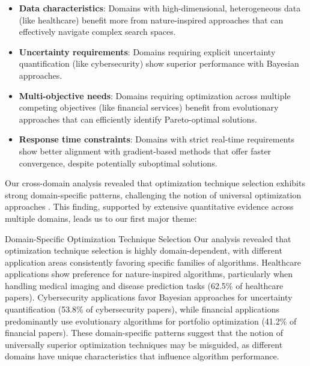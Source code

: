 \begin{itemize}
    \item \textbf{Data characteristics}: Domains with high-dimensional, heterogeneous data (like healthcare) benefit more from nature-inspired approaches that can effectively navigate complex search spaces.
    
    \item \textbf{Uncertainty requirements}: Domains requiring explicit uncertainty quantification (like cybersecurity) show superior performance with Bayesian approaches.
    
    \item \textbf{Multi-objective needs}: Domains requiring optimization across multiple competing objectives (like financial services) benefit from evolutionary approaches that can efficiently identify Pareto-optimal solutions.
    
    \item \textbf{Response time constraints}: Domains with strict real-time requirements show better alignment with gradient-based methods that offer faster convergence, despite potentially suboptimal solutions.
\end{itemize}

Our cross-domain analysis revealed that optimization technique selection exhibits strong domain-specific patterns, challenging the notion of universal optimization approaches \citep{Eid20223845, Sagu202535, Kanchanamala20232414}. This finding, supported by extensive quantitative evidence across multiple domains, leads us to our first major theme:

\begin{themebox}{Domain-Specific Optimization Technique Selection}
Our analysis revealed that optimization technique selection is highly domain-dependent, with different application areas consistently favoring specific families of algorithms. Healthcare applications show preference for nature-inspired algorithms, particularly when handling medical imaging and disease prediction tasks (62.5\% of healthcare papers). Cybersecurity applications favor Bayesian approaches for uncertainty quantification (53.8\% of cybersecurity papers), while financial applications predominantly use evolutionary algorithms for portfolio optimization (41.2\% of financial papers). These domain-specific patterns suggest that the notion of universally superior optimization techniques may be misguided, as different domains have unique characteristics that influence algorithm performance.
\end{themebox}

